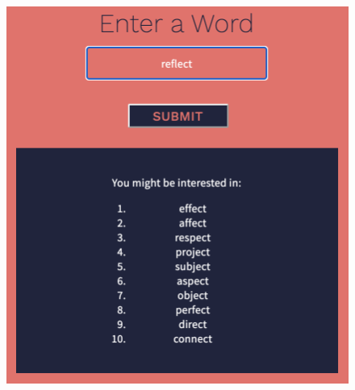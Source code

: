 \documentclass[11pt]{article}
\begin{document}
\begin{figure}[H]
\includegraphics[scale = 0.54]{17_2}
\centering
\end{figure}
\end{document}
